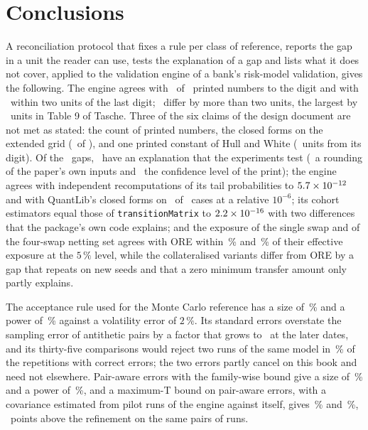 \section{Conclusions}
\label{sec:conclusions}

A reconciliation protocol that fixes a rule per class of reference, reports the gap in a unit the reader can use, tests the explanation of a gap and lists what it does not cover, applied to the validation engine of a bank's risk-model validation, gives the following. The engine agrees with \nPrintedAgree\ of \nPrintedN\ printed numbers to the digit and with \nAgreeTwoUnits\ within two units of the last digit; \nBinBeyond\ differ by more than two units, the largest by \nTableNineMaxUnits\ units in Table 9 of Tasche. Three of the six claims of the design document are not met as stated: the count of printed numbers, the closed forms on the extended grid (\nClosedWithin\ of \nClosedCases), and one printed constant of Hull and White (\nWWAtwoUnits\ units from its digit). Of the \nMissTotal\ gaps, \nMissTested\ have an explanation that the experiments test (\nMissRound\ a rounding of the paper's own inputs and \nMissLevel\ the confidence level of the print); the engine agrees with independent recomputations of its tail probabilities to $5.7\times10^{-12}$ and with QuantLib's closed forms on \nClosedWithin\ of \nClosedCases\ cases at a relative $10^{-6}$; its cohort estimators equal those of \texttt{transitionMatrix} to $2.2\times10^{-16}$ with two differences that the package's own code explains; and the exposure of the single swap and of the four-swap netting set agrees with ORE within \nSingleEquivalence\,\% and \nNettingEquivalence\,\% of their effective exposure at the $5\,\%$ level, while the collateralised variants differ from ORE by a gap that repeats on new seeds and that a zero minimum transfer amount only partly explains.

The acceptance rule used for the Monte Carlo reference has a size of \nSizeProdNetting\,\% and a power of \nPowerProdSigmaTwo\,\% against a volatility error of $2\,\%$. Its standard errors overstate the sampling error of antithetic pairs by a factor that grows to \nOverstateLast\ at the later dates, and its thirty-five comparisons would reject two runs of the same model in \nSizePairNetting\,\% of the repetitions with correct errors; the two errors partly cancel on this book and need not elsewhere. Pair-aware errors with the family-wise bound give a size of \nSizeRefineNetting\,\% and a power of \nPowerRefineSigmaTwo\,\%, and a maximum-T bound on pair-aware errors, with a covariance estimated from pilot runs of the engine against itself, gives \nSizePairMaxtNetting\,\% and \nPowerPairMaxtSigmaTwo\,\%, \nMaxtGainNetting\ points above the refinement on the same pairs of runs.

